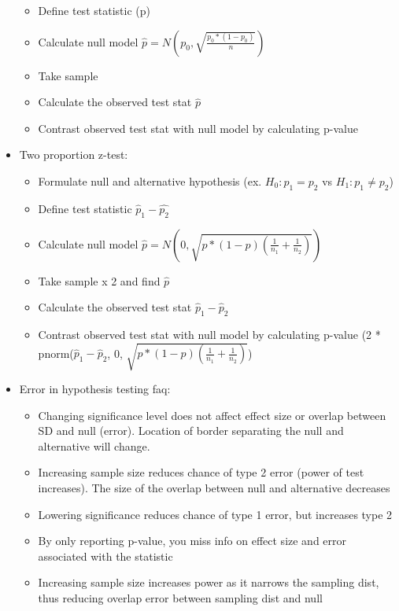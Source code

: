 \documentclass[8pt,landscape,a4paper, fleqn, dvipsnames]{extarticle}
\begin{document}
\begin{multicols*}{4}
\begin{itemize}
\begin{itemize}
        \item Define test statistic (p)
        \item Calculate null model $\hat{p} = N(p_0, \sqrt{\frac{p_0*(1 - p_0)}{n}})$
        \item Take sample 
        \item Calculate the observed test stat $\hat{p}$
        \item Contrast observed test stat with null model by calculating p-value
    \end{itemize}
    \item Two proportion z-test:
    \begin{itemize}
        \item Formulate null and alternative hypothesis (ex. $H_0: p_1 = p_2$ vs $H_1: p_1 \neq p_2$)
        \item Define test statistic $\hat{p}_1 - \hat{p_2}$
        \item Calculate null model $\hat{p} = N(0, \sqrt{p*(1 - p)(\frac{1}{n_1} + \frac{1}{n_2})})$
        \item Take sample x 2 and find $\hat{p}$
        \item Calculate the observed test stat $\hat{p}_1 - \hat{p}_2$
        \item Contrast observed test stat with null model by calculating p-value (2 * pnorm($\hat{p}_1 - \hat{p}_2$, 0, $\sqrt{p*(1 - p)(\frac{1}{n_1} + \frac{1}{n_2})}$)
    \end{itemize}
    \item Error in hypothesis testing faq:
    \begin{itemize}
        \item Changing significance level does not affect effect size or overlap between SD and null (error). Location of border separating the null and alternative will change.
        \item Increasing sample size reduces chance of type 2 error (power of test increases). The size of the overlap between null and alternative decreases
        \item Lowering significance reduces chance of type 1 error, but increases type 2
        \item By only reporting p-value, you miss info on effect size and error associated with the statistic
        \item Increasing sample size increases power as it narrows the sampling dist, thus reducing overlap error between sampling dist and null
    \end{itemize}

\end{itemize}
\end{multicols*}
\end{document}
